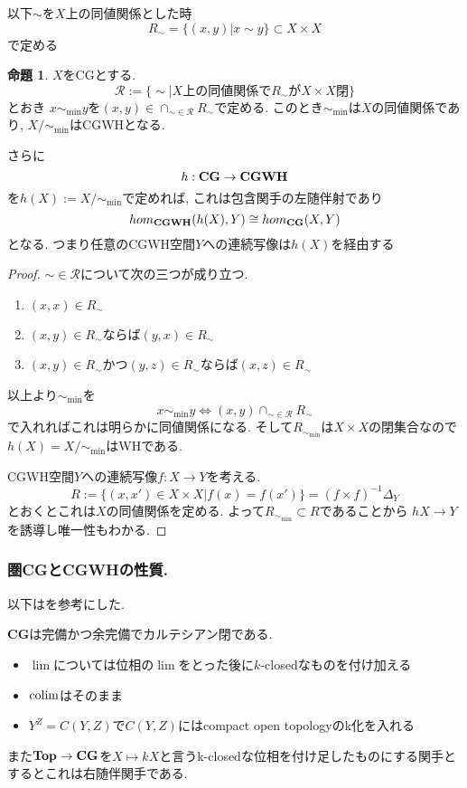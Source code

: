 \documentclass[dvipdfmx,a4paper,11pt]{article}
\newcommand{\colim}{{\rm colim}}
\theoremstyle{definition}
\newtheorem{prop}[thm]{命題}
\begin{document}
以下$\sim$を$X$上の同値関係とした時
$$
R_{\sim}= \{ (x,y)| x \sim y\} \subset X \times X
$$
で定める
 \begin{tcolorbox}
 [colback = white, colframe = green!35!black, fonttitle = \bfseries,breakable = true]
\begin{prop}\cite[Prop2.22]{Str}
$X$をCGとする.
$$
\mathcal{R}:=\{\sim | \text{$X$上の同値関係で$R_{\sim}$が$X \times X$閉} \}
$$
とおき
$x \sim_{\min} y$を$(x,y) \in \cap_{\sim \in \mathcal{R}} R_{\sim}$で定める.
このとき$\sim_{\min}$は$X$の同値関係であり, $X/\sim_{\min}$はCGWHとなる.

さらに
$$
h : {\bf CG } \to {\bf CGWH}
$$
を$h(X) := X/\sim_{\min}$で定めれば, これは包含関手の左随伴射であり
$$
hom_{{\bf CGWH}}(h(X), Y) \cong hom_{{\bf CG}}(X, Y)
$$
となる. 
つまり任意のCGWH空間$Y$への連続写像は$h(X)$を経由する

\end{prop}
\end{tcolorbox}

\begin{proof}

$\sim \in \mathcal{R}$について次の三つが成り立つ.
\begin{enumerate}
\item $(x,x) \in R_{\sim}$
\item $(x,y)\in R_{\sim}$ならば$(y,x) \in R_{\sim}$
\item $(x,y) \in R_{\sim}$かつ$(y,z) \in R_{\sim}$ならば$(x,z) \in R_{\sim}$
\end{enumerate}
以上より$\sim_{\min}$を
$$
x \sim_{\min} y
\Leftrightarrow
(x,y) \cap_{\sim \in \mathcal{R}} R_{\sim}
$$
で入れればこれは明らかに同値関係になる.
そして$R_{\sim_{\min}}$は$X \times X$の閉集合なので$h(X)=X/\sim_{\min}$はWHである.

CGWH空間$Y$への連続写像$f : X \to Y$を考える.
$$
R:= \{ (x, x') \in X \times X | f(x) = f(x')\}=(f \times f)^{-1}\Delta_{Y}
$$
とおくとこれは$X$の同値関係を定める.
よって$R_{\sim_{\min}} \subset R$であることから
$hX \to Y$を誘導し唯一性もわかる.  
\end{proof}



\subsubsection{圏{\bf CG}と{\bf CGWH}の性質.}
以下は\cite{Fra}を参考にした. 

\begin{tcolorbox}
 [colback = white, colframe = green!35!black, fonttitle = \bfseries,breakable = true]
 {\bf CG}は完備かつ余完備でカルテシアン閉である.
 \begin{itemize}
 \item $\lim$については位相の$\lim$をとった後に$k$-closedなものを付け加える
 \item $\colim$はそのまま
 \item $Y^{Z} = C(Y,Z)$で$C(Y,Z)$にはcompact open topologyのk化を入れる
 \end{itemize}
 また$ {\bf Top}\to { \bf CG }$を$X \mapsto kX$と言うk-closedな位相を付け足したものにする関手とするとこれは右随伴関手である. 
\end{tcolorbox}
\end{document}

